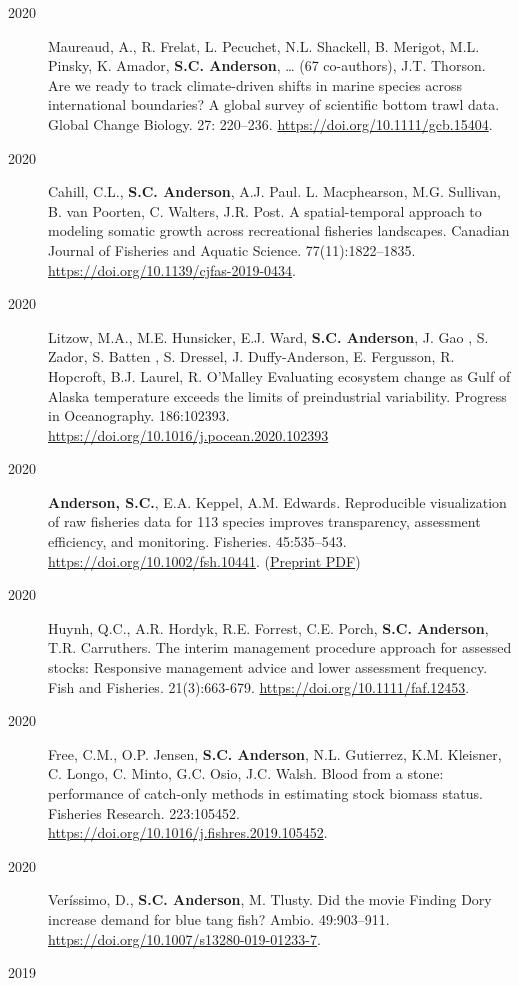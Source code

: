 \begin{description}
\item[2020]
Maureaud, A., R. Frelat, L. Pecuchet, N.L. Shackell, B. Merigot, M.L.
Pinsky, K. Amador, \textbf{S.C. Anderson}, \ldots{} (67 co-authors),
J.T. Thorson. Are we ready to track climate-driven shifts in marine
species across international boundaries? A global survey of scientific
bottom trawl data. Global Change Biology. 27: 220--236.
\url{https://doi.org/10.1111/gcb.15404}.
\item[2020]
Cahill, C.L., \textbf{S.C. Anderson}, A.J. Paul. L. Macphearson, M.G.
Sullivan, B. van Poorten, C. Walters, J.R. Post. A spatial-temporal
approach to modeling somatic growth across recreational fisheries
landscapes. Canadian Journal of Fisheries and Aquatic Science.
77(11):1822--1835. \url{https://doi.org/10.1139/cjfas-2019-0434}.
\item[2020]
Litzow, M.A., M.E. Hunsicker, E.J. Ward, \textbf{S.C. Anderson}, J. Gao
, S. Zador, S. Batten , S. Dressel, J. Duffy-Anderson, E. Fergusson, R.
Hopcroft, B.J. Laurel, R. O'Malley Evaluating ecosystem change as Gulf
of Alaska temperature exceeds the limits of preindustrial variability.
Progress in Oceanography. 186:102393.
\url{https://doi.org/10.1016/j.pocean.2020.102393}
\item[2020]
\textbf{Anderson, S.C.}, E.A. Keppel, A.M. Edwards. Reproducible
visualization of raw fisheries data for 113 species improves
transparency, assessment efficiency, and monitoring. Fisheries.
45:535--543. \url{https://doi.org/10.1002/fsh.10441}.
(\href{https://www.dropbox.com/s/4mmnomvmpg0dbky/Anderson_etal_2020_reproducible_visualization_preprint.pdf?dl=1}{Preprint
PDF})
\item[2020]
Huynh, Q.C., A.R. Hordyk, R.E. Forrest, C.E. Porch, \textbf{S.C.
Anderson}, T.R. Carruthers. The interim management procedure approach
for assessed stocks: Responsive management advice and lower assessment
frequency. Fish and Fisheries. 21(3):663-679.
\url{https://doi.org/10.1111/faf.12453}.
\item[2020]
Free, C.M., O.P. Jensen, \textbf{S.C. Anderson}, N.L. Gutierrez, K.M.
Kleisner, C. Longo, C. Minto, G.C. Osio, J.C. Walsh. Blood from a stone:
performance of catch-only methods in estimating stock biomass status.
Fisheries Research. 223:105452.
\url{https://doi.org/10.1016/j.fishres.2019.105452}.
\item[2020]
Veríssimo, D., \textbf{S.C. Anderson}, M. Tlusty. Did the movie Finding
Dory increase demand for blue tang fish? Ambio. 49:903--911.
\url{https://doi.org/10.1007/s13280-019-01233-7}.
\item[2019]

\end{description}
